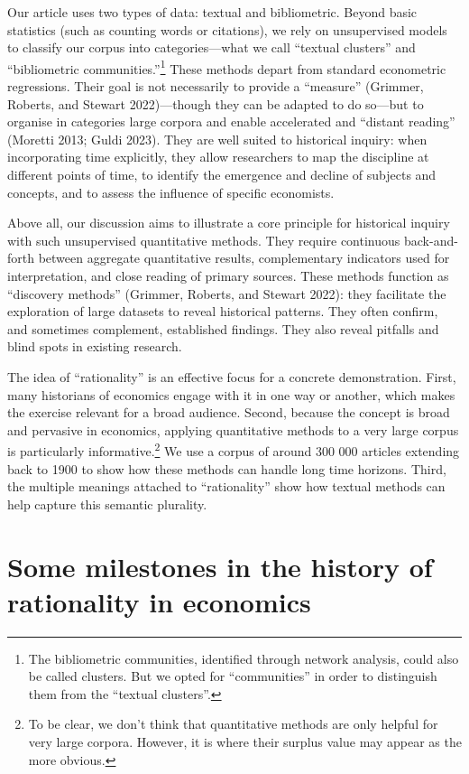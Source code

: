 \documentclass[
]{interact}
\begin{document}
Our article uses two types of data: textual and bibliometric. Beyond
basic statistics (such as counting words or citations), we rely on
unsupervised models to classify our corpus into categories---what we
call ``textual clusters'' and ``bibliometric communities.''\footnote{The
  bibliometric communities, identified through network analysis, could
  also be called clusters. But we opted for ``communities'' in order to
  distinguish them from the ``textual clusters''.} These methods depart
from standard econometric regressions. Their goal is not necessarily to
provide a ``measure'' (Grimmer, Roberts, and Stewart 2022)---though they
can be adapted to do so---but to organise in categories large corpora
and enable accelerated and ``distant reading'' (Moretti 2013; Guldi
2023). They are well suited to historical inquiry: when incorporating
time explicitly, they allow researchers to map the discipline at
different points of time, to identify the emergence and decline of
subjects and concepts, and to assess the influence of specific
economists.

Above all, our discussion aims to illustrate a core principle for
historical inquiry with such unsupervised quantitative methods. They
require continuous back-and-forth between aggregate quantitative
results, complementary indicators used for interpretation, and close
reading of primary sources. These methods function as ``discovery
methods'' (Grimmer, Roberts, and Stewart 2022): they facilitate the
exploration of large datasets to reveal historical patterns. They often
confirm, and sometimes complement, established findings. They also
reveal pitfalls and blind spots in existing research.

The idea of ``rationality'' is an effective focus for a concrete
demonstration. First, many historians of economics engage with it in one
way or another, which makes the exercise relevant for a broad audience.
Second, because the concept is broad and pervasive in economics,
applying quantitative methods to a very large corpus is particularly
informative.\footnote{To be clear, we don't think that quantitative
  methods are only helpful for very large corpora. However, it is where
  their surplus value may appear as the more obvious.} We use a corpus
of around 300 000 articles extending back to 1900 to show how these
methods can handle long time horizons. Third, the multiple meanings
attached to ``rationality'' show how textual methods can help capture
this semantic plurality.

\section{\texorpdfstring{\textbf{Some milestones in the history of
rationality in
economics}}{Some milestones in the history of rationality in economics}}\label{some-milestones-in-the-history-of-rationality-in-economics}
\end{document}
